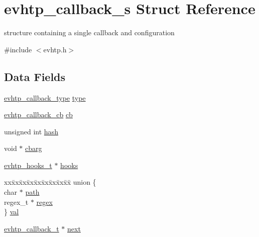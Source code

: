 \hypertarget{structevhtp__callback__s}{
\section{evhtp\_\-callback\_\-s Struct Reference}
\label{structevhtp__callback__s}
}


structure containing a single callback and configuration  




{\ttfamily \#include $<$evhtp.h$>$}

\subsection*{Data Fields}
\begin{DoxyCompactItemize}
\item 
\hyperlink{evhtp_8h_a6f45c416976c807084c7f71cb15c4f37}{evhtp\_\-callback\_\-type} \hyperlink{structevhtp__callback__s_a6da94264a51bd354aca3d22098a2aee5}{type}
\item 
\hyperlink{evhtp_8h_ae907dbe36b762aa2da912cedb57268d0}{evhtp\_\-callback\_\-cb} \hyperlink{structevhtp__callback__s_a783ee29046d4ff3e8c75f811e80fd57b}{cb}
\item 
unsigned int \hyperlink{structevhtp__callback__s_a09f9a9ce240560b1d191b42ed56af642}{hash}
\item 
void $\ast$ \hyperlink{structevhtp__callback__s_aafd3d1a6343925cb274875556a6faa0e}{cbarg}
\item 
\hyperlink{structevhtp__hooks__s}{evhtp\_\-hooks\_\-t} $\ast$ \hyperlink{structevhtp__callback__s_ac97663394f74c9030e57c771cfb7981e}{hooks}
\item 
\begin{tabbing}
xx\=xx\=xx\=xx\=xx\=xx\=xx\=xx\=xx\=\kill
union \{\\
\>char $\ast$ \hyperlink{structevhtp__callback__s_a44196e6a5696d10442c29e639437196e}{path}\\
\>regex\_t $\ast$ \hyperlink{structevhtp__callback__s_af71a3fad7fee5d731252ce89e56f948f}{regex}\\
\} \hyperlink{structevhtp__callback__s_a46fe687f5d6aa04ca3260318f08188b4}{val}\\

\end{tabbing}\item 
\hyperlink{structevhtp__callback__s}{evhtp\_\-callback\_\-t} $\ast$ \hyperlink{structevhtp__callback__s_a1ded21f298b6aa22576e7530697b9a3d}{next}
\end{DoxyCompactItemize}



